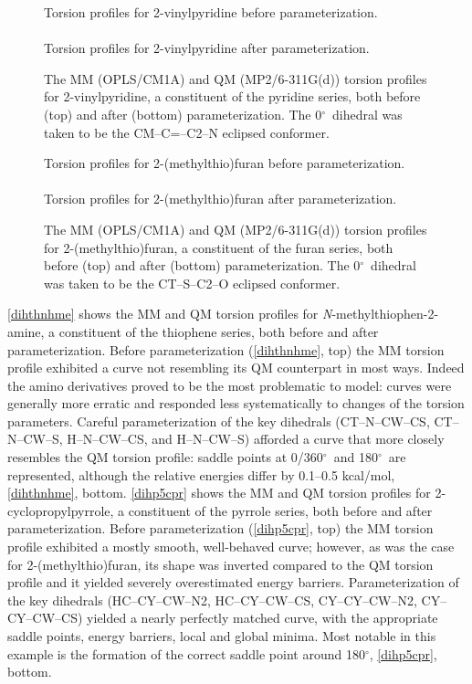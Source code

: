 \documentclass[12pt]{report}
\def\deg{$^{\circ}$}
\begin{document}
\begin{figure}[htbp]
\centering
Torsion profiles for 2-vinylpyridine before parameterization.\\
\\
Torsion profiles for 2-vinylpyridine after parameterization.\\

\caption{The MM (OPLS/CM1A) and QM (MP2/6-311G(d)) torsion profiles for 2-vinylpyridine, a constituent of the pyridine series, both before (top) and after (bottom) parameterization. The 0\deg\ dihedral was taken to be the CM--C=--C2--N eclipsed conformer.}
\label{dihp6vin}
\end{figure}

\begin{figure}[htbp]
\centering
Torsion profiles for 2-(methylthio)furan before parameterization.\\
\\
Torsion profiles for 2-(methylthio)furan after parameterization.\\

\caption{The MM (OPLS/CM1A) and QM (MP2/6-311G(d)) torsion profiles for 2-(methylthio)furan, a constituent of the furan series, both before (top) and after (bottom) parameterization. The 0\deg\ dihedral was taken to be the CT--S--C2--O eclipsed conformer.}
\label{dihfsme}
\end{figure}

\cref{dihthnhme} shows the MM and QM torsion profiles for \textit{N}-methylthiophen-2-amine, a constituent of the thiophene series, both before and after parameterization. Before parameterization (\cref{dihthnhme}, top) the MM torsion profile exhibited a curve not resembling its QM counterpart in most ways. Indeed the amino derivatives proved to be the most problematic to model: curves were generally more erratic and responded less systematically to changes of the torsion parameters. Careful parameterization of the key dihedrals (CT--N--CW--CS, CT--N--CW--S, H--N--CW--CS, and H--N--CW--S) afforded a curve that more closely resembles the QM torsion profile: saddle points at 0/360\deg\ and 180\deg\ are represented, although the relative energies differ by 0.1--0.5 kcal/mol, \cref{dihthnhme}, bottom. \cref{dihp5cpr} shows the MM and QM torsion profiles for 2-cyclopropylpyrrole, a constituent of the pyrrole series, both before and after parameterization. Before parameterization (\cref{dihp5cpr}, top) the MM torsion profile exhibited a mostly smooth, well-behaved curve; however, as was the case for 2-(methylthio)furan, its shape was inverted compared to the QM torsion profile and it yielded severely overestimated energy barriers. Parameterization of the key dihedrals (HC--CY--CW--N2, HC--CY--CW--CS, CY--CY--CW--N2, CY--CY--CW--CS) yielded a nearly perfectly matched curve, with the appropriate saddle points, energy barriers, local and global minima. Most notable in this example is the formation of the correct saddle point around 180\deg, \cref{dihp5cpr}, bottom.
\end{document}
